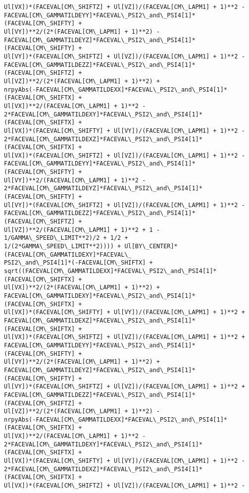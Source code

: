 \documentclass[landscape,letterpaper,10pt,english]{article}
\begin{document}
\begin{Verbatim}[commandchars=\\\{\}]
Ul[VX])*(FACEVAL[CM\_SHIFTZ] + Ul[VZ])/(FACEVAL[CM\_LAPM1] + 1)**2 -
FACEVAL[CM\_GAMMATILDEYY]*FACEVAL\_PSI2\_and\_PSI4[1]*(FACEVAL[CM\_SHIFTY] +
Ul[VY])**2/(2*(FACEVAL[CM\_LAPM1] + 1)**2) -
FACEVAL[CM\_GAMMATILDEYZ]*FACEVAL\_PSI2\_and\_PSI4[1]*(FACEVAL[CM\_SHIFTY] +
Ul[VY])*(FACEVAL[CM\_SHIFTZ] + Ul[VZ])/(FACEVAL[CM\_LAPM1] + 1)**2 -
FACEVAL[CM\_GAMMATILDEZZ]*FACEVAL\_PSI2\_and\_PSI4[1]*(FACEVAL[CM\_SHIFTZ] +
Ul[VZ])**2/(2*(FACEVAL[CM\_LAPM1] + 1)**2) +
nrpyAbs(-FACEVAL[CM\_GAMMATILDEXX]*FACEVAL\_PSI2\_and\_PSI4[1]*(FACEVAL[CM\_SHIFTX] +
Ul[VX])**2/(FACEVAL[CM\_LAPM1] + 1)**2 -
2*FACEVAL[CM\_GAMMATILDEXY]*FACEVAL\_PSI2\_and\_PSI4[1]*(FACEVAL[CM\_SHIFTX] +
Ul[VX])*(FACEVAL[CM\_SHIFTY] + Ul[VY])/(FACEVAL[CM\_LAPM1] + 1)**2 -
2*FACEVAL[CM\_GAMMATILDEXZ]*FACEVAL\_PSI2\_and\_PSI4[1]*(FACEVAL[CM\_SHIFTX] +
Ul[VX])*(FACEVAL[CM\_SHIFTZ] + Ul[VZ])/(FACEVAL[CM\_LAPM1] + 1)**2 -
FACEVAL[CM\_GAMMATILDEYY]*FACEVAL\_PSI2\_and\_PSI4[1]*(FACEVAL[CM\_SHIFTY] +
Ul[VY])**2/(FACEVAL[CM\_LAPM1] + 1)**2 -
2*FACEVAL[CM\_GAMMATILDEYZ]*FACEVAL\_PSI2\_and\_PSI4[1]*(FACEVAL[CM\_SHIFTY] +
Ul[VY])*(FACEVAL[CM\_SHIFTZ] + Ul[VZ])/(FACEVAL[CM\_LAPM1] + 1)**2 -
FACEVAL[CM\_GAMMATILDEZZ]*FACEVAL\_PSI2\_and\_PSI4[1]*(FACEVAL[CM\_SHIFTZ] +
Ul[VZ])**2/(FACEVAL[CM\_LAPM1] + 1)**2 + 1 - 1/GAMMA\_SPEED\_LIMIT**2)/2 + 1/2 +
1/(2*GAMMA\_SPEED\_LIMIT**2)))) + Ul[BY\_CENTER]*(FACEVAL[CM\_GAMMATILDEXY]*FACEVAL\_
PSI2\_and\_PSI4[1]*(-FACEVAL[CM\_SHIFTX] +
sqrt((FACEVAL[CM\_GAMMATILDEXX]*FACEVAL\_PSI2\_and\_PSI4[1]*(FACEVAL[CM\_SHIFTX] +
Ul[VX])**2/(2*(FACEVAL[CM\_LAPM1] + 1)**2) +
FACEVAL[CM\_GAMMATILDEXY]*FACEVAL\_PSI2\_and\_PSI4[1]*(FACEVAL[CM\_SHIFTX] +
Ul[VX])*(FACEVAL[CM\_SHIFTY] + Ul[VY])/(FACEVAL[CM\_LAPM1] + 1)**2 +
FACEVAL[CM\_GAMMATILDEXZ]*FACEVAL\_PSI2\_and\_PSI4[1]*(FACEVAL[CM\_SHIFTX] +
Ul[VX])*(FACEVAL[CM\_SHIFTZ] + Ul[VZ])/(FACEVAL[CM\_LAPM1] + 1)**2 +
FACEVAL[CM\_GAMMATILDEYY]*FACEVAL\_PSI2\_and\_PSI4[1]*(FACEVAL[CM\_SHIFTY] +
Ul[VY])**2/(2*(FACEVAL[CM\_LAPM1] + 1)**2) +
FACEVAL[CM\_GAMMATILDEYZ]*FACEVAL\_PSI2\_and\_PSI4[1]*(FACEVAL[CM\_SHIFTY] +
Ul[VY])*(FACEVAL[CM\_SHIFTZ] + Ul[VZ])/(FACEVAL[CM\_LAPM1] + 1)**2 +
FACEVAL[CM\_GAMMATILDEZZ]*FACEVAL\_PSI2\_and\_PSI4[1]*(FACEVAL[CM\_SHIFTZ] +
Ul[VZ])**2/(2*(FACEVAL[CM\_LAPM1] + 1)**2) -
nrpyAbs(-FACEVAL[CM\_GAMMATILDEXX]*FACEVAL\_PSI2\_and\_PSI4[1]*(FACEVAL[CM\_SHIFTX] +
Ul[VX])**2/(FACEVAL[CM\_LAPM1] + 1)**2 -
2*FACEVAL[CM\_GAMMATILDEXY]*FACEVAL\_PSI2\_and\_PSI4[1]*(FACEVAL[CM\_SHIFTX] +
Ul[VX])*(FACEVAL[CM\_SHIFTY] + Ul[VY])/(FACEVAL[CM\_LAPM1] + 1)**2 -
2*FACEVAL[CM\_GAMMATILDEXZ]*FACEVAL\_PSI2\_and\_PSI4[1]*(FACEVAL[CM\_SHIFTX] +
Ul[VX])*(FACEVAL[CM\_SHIFTZ] + Ul[VZ])/(FACEVAL[CM\_LAPM1] + 1)**2 -

\end{Verbatim}
\end{document}
